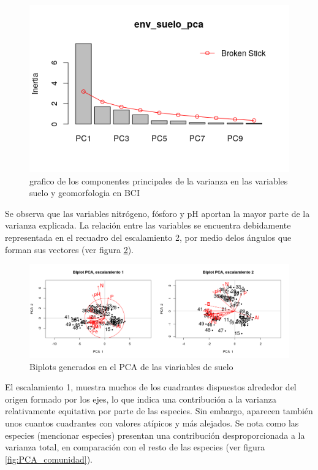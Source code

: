 \documentclass[11pt,]{article}
\begin{document}
\begin{figure}
\centering
\includegraphics{env_suelo_pca.png}
\caption{grafico de los componentes principales de la varianza en las
variables suelo y geomorfologia en BCI \label{fig:env_suelo_pca}}
\end{figure}

Se observa que las variables nitrógeno, fósforo y pH aportan la mayor
parte de la varianza explicada. La relación entre las variables se
encuentra debidamente representada en el recuadro del escalamiento 2,
por medio delos ángulos que forman sus vectores (ver figura
\ref{fig:Biplot_PCA_escalamiento}).

\begin{figure}
\centering
\includegraphics[width=1.00000\textwidth]{Biplot_PCA_escalamiento_actualizado.png}
\caption{Biplots generados en el PCA de las viariables de suelo
\label{fig:Biplot_PCA_escalamiento}}
\end{figure}

El escalamiento 1, muestra muchos de los cuadrantes dispuestos alrededor
del origen formado por los ejes, lo que indica una contribución a la
varianza relativamente equitativa por parte de las especies. Sin
embargo, aparecen también unos cuantos cuadrantes con valores atípicos y
más alejados. Se nota como las especies (mencionar especies) presentan
una contribución desproporcionada a la varianza total, en comparación
con el resto de las especies (ver figura \ref{fig:PCA_comunidad}).
\end{document}
